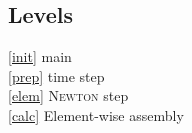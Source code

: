 % 
% 

\subsection{Levels}

\textcircled{\ref{init}} main\\
\textcircled{\ref{prep}} time step\\
\textcircled{\ref{elem}} \textsc{Newton} step\\
\textcircled{\ref{calc}} Element-wise assembly

